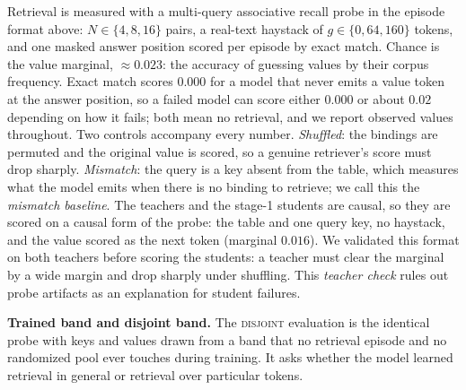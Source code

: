\documentclass{article}
\newcommand{\disj}{\textsc{disjoint}}
\begin{document}
Retrieval is measured with a multi-query associative recall probe in the episode format above: $N \in \{4, 8, 16\}$ pairs, a real-text haystack of $g \in \{0, 64, 160\}$ tokens, and one masked answer position scored per episode by exact match. Chance is the value marginal, ${\approx}0.023$: the accuracy of guessing values by their corpus frequency. Exact match scores $0.000$ for a model that never emits a value token at the answer position, so a failed model can score either $0.000$ or about $0.02$ depending on how it fails; both mean no retrieval, and we report observed values throughout. Two controls accompany every number. \emph{Shuffled}: the bindings are permuted and the original value is scored, so a genuine retriever's score must drop sharply. \emph{Mismatch}: the query is a key absent from the table, which measures what the model emits when there is no binding to retrieve; we call this the \emph{mismatch baseline}. The teachers and the stage-1 students are causal, so they are scored on a causal form of the probe: the table and one query key, no haystack, and the value scored as the next token (marginal $0.016$). We validated this format on both teachers before scoring the students: a teacher must clear the marginal by a wide margin and drop sharply under shuffling. This \emph{teacher check} rules out probe artifacts as an explanation for student failures.

\textbf{Trained band and disjoint band.} The \disj{} evaluation is the identical probe with keys and values drawn from a band that no retrieval episode and no randomized pool ever touches during training. It asks whether the model learned retrieval in general or retrieval over particular tokens.
\end{document}
